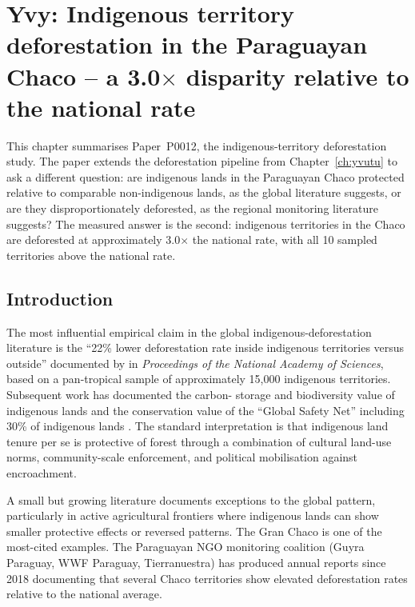 
\chapter{Yvy: Indigenous territory deforestation in the Paraguayan
Chaco -- a 3.0$\times$ disparity relative to the national rate}
\label{ch:yvy}

This chapter summarises Paper~P0012, the indigenous-territory
deforestation study. The paper extends the deforestation pipeline from
Chapter~\ref{ch:yvutu} to ask a different question: are indigenous
lands in the Paraguayan Chaco protected relative to comparable
non-indigenous lands, as the global literature suggests, or are they
disproportionately deforested, as the regional monitoring literature
suggests? The measured answer is the second: indigenous territories
in the Chaco are deforested at approximately 3.0$\times$ the national
rate, with all 10 sampled territories above the national rate.

\section{Introduction}
\label{sec:yvy-intro}

The most influential empirical claim in the global
indigenous-deforestation literature is the ``22\% lower deforestation
rate inside indigenous territories versus outside'' documented by
\citet{sze2022} in \emph{Proceedings of the National Academy of
Sciences}, based on a pan-tropical sample of approximately 15{,}000
indigenous territories. Subsequent work has documented the carbon-
storage and biodiversity value of indigenous lands \citep{garnett2018}
and the conservation value of the ``Global Safety Net'' including
30\% of indigenous lands \citep{dinerstein2020}. The standard
interpretation is that indigenous land tenure per se is protective of
forest through a combination of cultural land-use norms,
community-scale enforcement, and political mobilisation against
encroachment.

A small but growing literature documents exceptions to the global
pattern, particularly in active agricultural frontiers where indigenous
lands can show smaller protective effects or reversed patterns. The
Gran Chaco is one of the most-cited examples. The Paraguayan NGO
monitoring coalition (Guyra Paraguay, WWF Paraguay, Tierranuestra)
has produced annual reports since 2018 documenting that several Chaco
territories show elevated deforestation rates relative to the
national average.

